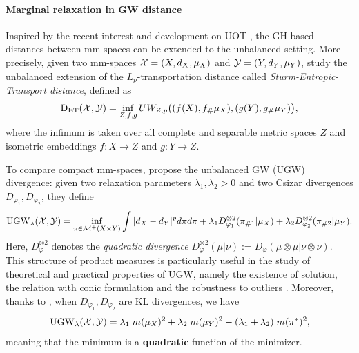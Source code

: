 \paragraph{Marginal relaxation in GW distance} Inspired by the recent interest and development
on UOT \citep{Liero18}, the GH-based distances between mm-spaces can be extended to
the unbalanced setting. More precisely, given two mm-spaces
$\mathcal X = (X, d_X, \mu_X)$ and $\mathcal Y = (Y, d_Y, \mu_Y)$, \citet{Ponti20}
study the unbalanced extension of the $L_p$-transportation distance called
\textit{Sturm-Entropic-Transport distance}, defined as
\begin{align}
  \text{D}_{\text{ET}}(\mathcal X, \mathcal Y) =
  \inf_{Z, f, g} UW_{Z, p}\big( (f(X), f_{\#} \mu_X), (g(Y), g_{\#} \mu_Y) \big),
\end{align}
where the infimum is taken over all complete and separable metric spaces $Z$ and
isometric embeddings $f: X \to Z$ and $g: Y \to Z$.

To compare compact mm-spaces,
\citet{Sejourne20} propose the unbalanced GW (UGW) divergence: given two relaxation parameters
$\lambda_1, \lambda_2 > 0$ and two Csizar divergences $D_{\varphi_1}, D_{\varphi_2}$, they define
\begin{align}
  \text{UGW}_{\lambda}(\mathcal X, \mathcal Y) =
  \inf_{ \pi \in \mathcal M^+(X \times Y)} \int |d_X - d_Y|^p d\pi d\pi +
  \lambda_1 D_{\varphi_1}^{\otimes 2}(\pi_{\# 1} | \mu_X) +
  \lambda_2 D_{\varphi_2}^{\otimes 2}(\pi_{\# 2} | \mu_Y).
\end{align}
Here, $D_{\varphi}^{\otimes 2}$ denotes the \textit{quadratic divergence}
$D_{\varphi}^{\otimes 2}(\mu | \nu) := D_{\varphi}(\mu \otimes \mu | \nu \otimes \nu)$.
This structure of product measures is particularly useful in the study of theoretical
and practical properties of UGW, namely the existence of solution,
the relation with conic formulation \citep{Sejourne20} and the robustness to outliers \citep{Tran23}.
Moreover, thanks to ,
when $D_{\varphi_1}, D_{\varphi_2}$ are KL divergences, we have
\begin{align}
  \label{eq:ugw_minimizer_minimum}
  \text{UGW}_{\lambda}(\mathcal X, \mathcal Y) = \lambda_1 \; m(\mu_X)^2 + \lambda_2 \; m(\mu_Y)^2
  - (\lambda_1 + \lambda_2) \; m(\pi^*)^2,
\end{align}
meaning that the minimum is a \textbf{quadratic} function of the minimizer.

